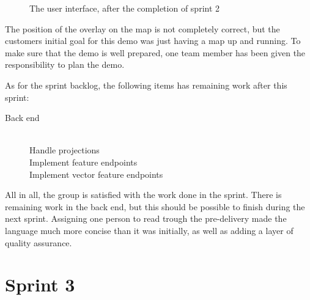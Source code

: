 \documentclass[11pt,a4paper,titlepage,oneside]{report}
\begin{document}
\begin{figure}[h]
\begin{center}
\caption{The user interface, after the completion of sprint 2}
\label{fig:UIAfterSprint2}
\end{center}
\end{figure}

The position of the overlay on the map is not completely correct, but the customers initial goal for this demo was just having a map up and running. To make sure that the demo is well prepared, one team member has been given the responsibility to plan the demo. 

As for the sprint backlog, the following items has remaining work after this sprint:

\begin{description}
	\item[Back end] \hfill \\
	Handle projections \hfill \\
	Implement feature endpoints \hfill \\
	Implement vector feature endpoints
\end{description}

All in all, the group is satisfied with the work done in the sprint. There is remaining work in the back end, but this should be possible to finish during the next sprint. Assigning one person to read trough the \gls{pre-delivery} made the language much more concise than it was initially, as well as adding a layer of quality assurance. 



\chapter{Sprint 3}
\end{document}
